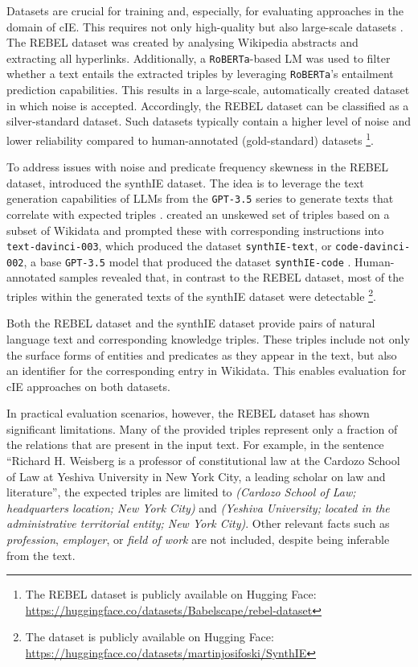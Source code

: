 \documentclass[a4paper,oneside,bibliography=totoc]{scrbook}
\begin{document}
Datasets are crucial for training and, especially, for evaluating approaches in the domain of \ac{cIE}. This requires not only high-quality but also large-scale datasets \cite{Josifoski2023}. The REBEL dataset was created by analysing Wikipedia abstracts and extracting all hyperlinks. Additionally, a \texttt{RoBERTa}-based \ac{LM} was used to filter whether a text entails the extracted triples by leveraging \texttt{RoBERTa}’s entailment prediction capabilities. This results in a large-scale, automatically created dataset in which noise is accepted. Accordingly, the REBEL dataset can be classified as a silver-standard dataset. Such datasets typically contain a higher level of noise and lower reliability compared to human-annotated (gold-standard) datasets \cite{HuguetCabot2021}\footnote{The REBEL dataset is publicly available on Hugging Face: \url{https://huggingface.co/datasets/Babelscape/rebel-dataset}}.

To address issues with noise and predicate frequency skewness in the REBEL dataset, \citet{Josifoski2023} introduced the synthIE dataset. The idea is to leverage the text generation capabilities of \acp{LLM} from the \texttt{GPT-3.5} series to generate texts that correlate with expected triples \cite{Josifoski2023}. \citet{Josifoski2023} created an unskewed set of triples based on a subset of Wikidata and prompted these with corresponding instructions into \texttt{text-davinci-003}, which produced the dataset \texttt{synthIE-text}, or \texttt{code-davinci-002}, a base \texttt{GPT-3.5} model that produced the dataset \texttt{synthIE-code} \cite{Josifoski2023,OpenAI2025a}. Human-annotated samples revealed that, in contrast to the REBEL dataset, most of the triples within the generated texts of the synthIE dataset were detectable \cite{Josifoski2023}\footnote{The dataset is publicly available on Hugging Face: \url{https://huggingface.co/datasets/martinjosifoski/SynthIE}}.

Both the REBEL dataset and the synthIE dataset provide pairs of natural language text and corresponding knowledge triples. These triples include not only the surface forms of entities and predicates as they appear in the text, but also an identifier for the corresponding entry in Wikidata. This enables evaluation for \ac{cIE} approaches on both datasets.

In practical evaluation scenarios, however, the REBEL dataset has shown significant limitations. Many of the provided triples represent only a fraction of the relations that are present in the input text. For example, in the sentence \enquote{Richard H. Weisberg is a professor of constitutional law at the Cardozo School of Law at Yeshiva University in New York City, a leading scholar on law and literature}, the expected triples are limited to \textit{(Cardozo School of Law; headquarters location; New York City)} and \textit{(Yeshiva University; located in the administrative territorial entity; New York City)}. Other relevant facts such as \textit{profession}, \textit{employer}, or \textit{field of work} are not included, despite being inferable from the text.
\end{document}
